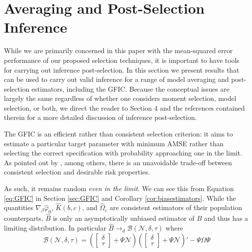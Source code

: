 \section{Averaging and Post-Selection Inference}
\label{sec:avg}

While we are primarily concerned in this paper with the mean-squared error performance of our proposed selection techniques, it is important to have tools for carrying out  inference post-selection.
In this section we present results that can be used to carry out valid inference for a range of model averaging and post-selection estimators, including the GFIC.
Because the conceptual issues are largely the same regardless of whether one considers moment selection, model selection, or both, we direct the reader to \cite{DiTraglia2016} Section 4 and the references contained therein for a more detailed discussion of inference post-selection.

The GFIC is an efficient rather than consistent selection criterion: it aims to estimate a particular target parameter with minimum AMSE rather than selecting the correct specification with probability approaching one in the limit.
As pointed out by \cite{Yang2005}, among others, there is an unavoidable trade-off between consistent selection and desirable risk properties.

As such, it remains random \emph{even in the limit}.
We can see this from Equation \ref{eq:GFIC} in Section \ref{sec:GFIC} and Corollary \ref{cor:biasestimators}.
While the quantities $\nabla_\beta \widehat{\varphi}_0$, $\widehat{K}(b,c)$, and $\widehat{\Omega}_c$ are consistent estimators of their population counterparts, $\widehat{B}$ is only an asymptotically unbiased estimator of $B$ and thus has a limiting distribution.
In particular $\widehat{B} \rightarrow_d \mathscr{B}(\mathscr{N}, \delta, \tau)$ where
\begin{equation}
  \mathscr{B}(\mathscr{N}, \delta, \tau) = 
  \left(\left[
  \begin{array}{c}
    \delta \\ \tau
  \end{array}
\right] + \Psi \mathscr{N}\right)
  \left(\left[
  \begin{array}{c}
    \delta \\ \tau
  \end{array}
\right] + \Psi \mathscr{N}\right)' - \Psi \Omega \Psi
\end{equation}

 

